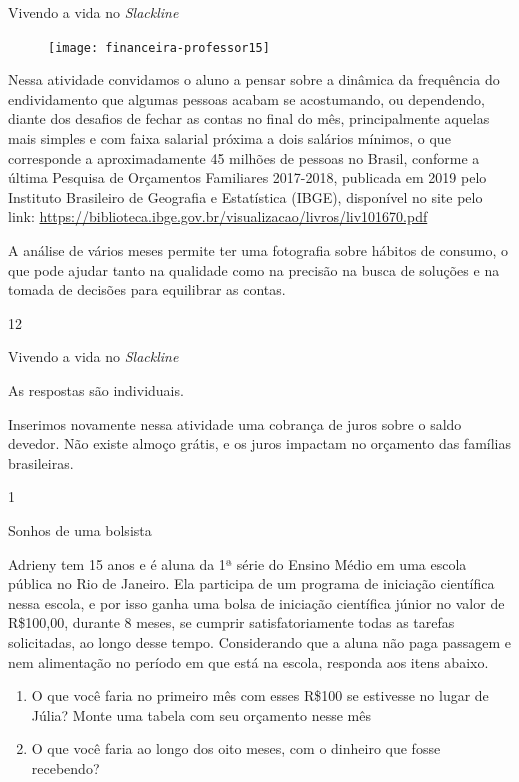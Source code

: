 \clearmargin
\begin{sugestions}{Vivendo a vida no \textit{Slackline}}
{
\begin{figure}
\vspace{-1em}
\texttt{[image: financeira-professor15]}
\end{figure}
Nessa atividade convidamos o aluno a pensar sobre a dinâmica da frequência do endividamento que algumas pessoas acabam se acostumando, ou dependendo, diante dos desafios de fechar as contas no final do mês, principalmente aquelas mais simples e com faixa salarial próxima a dois salários mínimos, o que corresponde a aproximadamente 45 milhões de pessoas no Brasil, conforme a última Pesquisa de Orçamentos Familiares 2017-2018, publicada em 2019 pelo Instituto Brasileiro de Geografia e Estatística (IBGE), disponível no site pelo link: \url{https://biblioteca.ibge.gov.br/visualizacao/livros/liv101670.pdf}

A análise de vários meses permite ter uma fotografia sobre hábitos de consumo, o que pode ajudar tanto na qualidade como na precisão na busca de soluções e na tomada de decisões para equilibrar as contas.
}{1}{2}
\end{sugestions}
\marginpar{\vspace{.5em}}


\begin{answer}{Vivendo a vida no \textit{Slackline}}
{
  As respostas são individuais. 

  Inserimos novamente nessa atividade uma cobrança de juros sobre o saldo devedor. Não existe almoço grátis, e os juros impactam no orçamento das famílias brasileiras.
}{1}
\end{answer}

\label{fin-prac-2}

\begin{task}{Sonhos de uma bolsista}
\label{fin-ativ-10}

Adrieny tem 15 anos e é aluna da 1ª série do Ensino Médio em uma escola pública no Rio de Janeiro. Ela participa de um programa de iniciação científica nessa escola, e por isso ganha uma bolsa de iniciação científica júnior no valor de R\$100{,}00, durante 8 meses, se cumprir satisfatoriamente todas as tarefas solicitadas, ao longo desse tempo. Considerando que a aluna não paga passagem e nem alimentação no período em que está na escola, responda aos itens abaixo.

\begin{enumerate}
\item O que você faria no primeiro mês com esses R\$100 se estivesse no lugar de Júlia? Monte uma tabela com seu orçamento nesse mês
\item O que você faria ao longo dos oito meses, com o dinheiro que fosse recebendo?
\end{enumerate}
\end{task}

